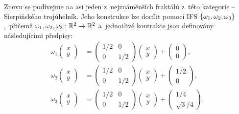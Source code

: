 Znovu se podívejme na asi jeden z~nejznáměnších fraktálů z~této kategorie -- Sierpińského trojúhelník. Jeho konstrukce lze docílit pomocí IFS $\left\{\omega_1,\omega_2,\omega_3\right\}$,~přičemž $\omega_1,\omega_2,\omega_3:\mathbb{R}^2 \rightarrow \mathbb{R}^2$ a~jednotlivé kontrakce jsou definovány následujícími předpisy:
\begin{align*}
    \omega_1\left(\begin{matrix}
        x\\
        y
    \end{matrix}\right)&=\left(\begin{matrix}
        1/2 & 0\\
        0 & 1/2
    \end{matrix}\right)\left(\begin{matrix}
        x\\
        y
    \end{matrix}\right)+\left(\begin{matrix}
        0\\
        0
    \end{matrix}\right),\\
    \omega_2\left(\begin{matrix}
        x\\
        y
    \end{matrix}\right)&=\left(\begin{matrix}
        1/2 & 0\\
        0 & 1/2
    \end{matrix}\right)\left(\begin{matrix}
        x\\
        y
    \end{matrix}\right)+\left(\begin{matrix}
        1/2\\
        0
    \end{matrix}\right),\\
    \omega_3\left(\begin{matrix}
        x\\
        y
    \end{matrix}\right)&=\left(\begin{matrix}
        1/2 & 0\\
        0 & 1/2
    \end{matrix}\right)\left(\begin{matrix}
        x\\
        y
    \end{matrix}\right)+\left(\begin{matrix}
        1/4\\
        \sqrt{3}/4
    \end{matrix}\right).
\end{align*}
